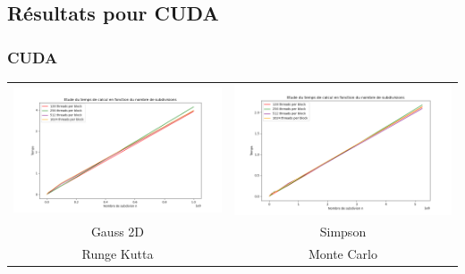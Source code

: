 \documentclass[10pt]{beamer}
\begin{document}
\subsection{Résultats pour CUDA}

\begin{frame}
    \frametitle{CUDA}
        \small
    \begin{tabular}{cc}
        \includegraphics[width=0.45\linewidth]{../Images/time_simpson_cuda.png} &
        \includegraphics[width=0.45\linewidth]{../Images/time_Gauss2D_cuda.png} \\
        Gauss 2D & Simpson \\
        Runge Kutta & Monte Carlo \\
    \end{tabular}
        
\end{frame}
\end{document}

